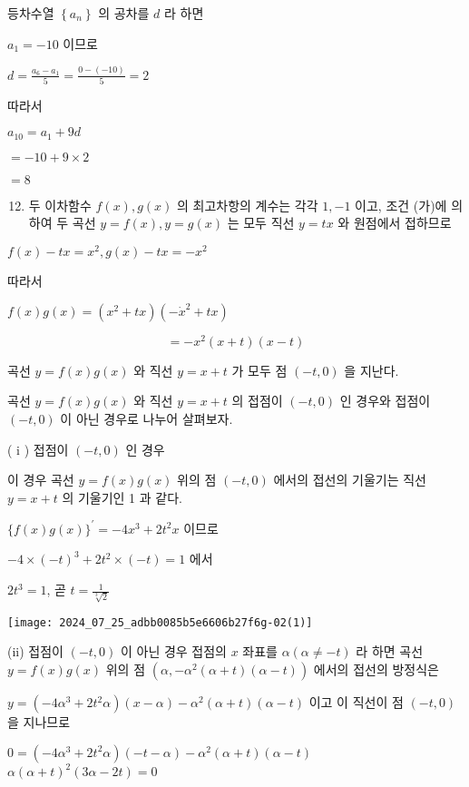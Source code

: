 \documentclass[10pt]{article}
\begin{document}
등차수열 $\left\{a_{n}\right\}$ 의 공차를 $d$ 라 하면

$a_{1}=-10$ 이므로

$d=\frac{a_{6}-a_{1}}{5}=\frac{0-(-10)}{5}=2$

따라서

$a_{10}=a_{1}+9 d$

$=-10+9 \times 2$

$=8$

\begin{enumerate}
  \setcounter{enumi}{11}
  \item 두 이차함수 $f(x), g(x)$ 의 최고차항의 계수는 각각 $1,-1$ 이고, 조건 (가)에 의하여 두 곡선 $y=f(x), y=g(x)$ 는 모두 직선 $y=t x$ 와 원점에서 접하므로
\end{enumerate}

$f(x)-t x=x^{2}, g(x)-t x=-x^{2}$

따라서

$f(x) g(x)=\left(x^{2}+t x\right)\left(-\dot{x}^{2}+t x\right)$

\[
=-x^{2}(x+t)(x-t)
\]

곡선 $y=f(x) g(x)$ 와 직선 $y=x+t$ 가 모두 점 $(-t, 0)$ 을 지난다.

곡선 $y=f(x) g(x)$ 와 직선 $y=x+t$ 의 접점이 $(-t, 0)$ 인 경우와 접점이 $(-t, 0)$ 이 아닌 경우로 나누어 살펴보자.

( i ) 접점이 $(-t, 0)$ 인 경우

이 경우 곡선 $y=f(x) g(x)$ 위의 점 $(-t, 0)$ 에서의 접선의 기울기는 직선 $y=x+t$ 의 기울기인 1 과 같다.

$\{f(x) g(x)\}^{\prime}=-4 x^{3}+2 t^{2} x$ 이므로

$-4 \times(-t)^{3}+2 t^{2} \times(-t)=1$ 에서

$2 t^{3}=1$, 곧 $t=\frac{1}{\sqrt[3]{2}}$

\begin{center}
\texttt{[image: 2024\_07\_25\_adbb0085b5e6606b27f6g-02(1)]}
\end{center}

(ii) 접점이 $(-t, 0)$ 이 아닌 경우 접점의 $x$ 좌표를 $\alpha(\alpha \neq-t)$ 라 하면 곡선 $y=f(x) g(x)$ 위의 점 $\left(\alpha,-\alpha^{2}(\alpha+t)(\alpha-t)\right)$ 에서의 접선의 방정식은

$y=\left(-4 \alpha^{3}+2 t^{2} \alpha\right)(x-\alpha)-\alpha^{2}(\alpha+t)(\alpha-t)$ 이고 이 직선이 점 $(-t, 0)$ 을 지나므로

$0=\left(-4 \alpha^{3}+2 t^{2} \alpha\right)(-t-\alpha)-\alpha^{2}(\alpha+t)(\alpha-t)$ $\alpha(\alpha+t)^{2}(3 \alpha-2 t)=0$
\end{document}
